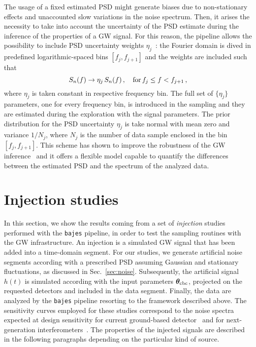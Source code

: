 \documentclass[prd,aps,twocolumn,a4paper,showkeys,nofootinbib,floatfix]{revtex4-1}
\newcommand{\be}{\begin{equation}}
\newcommand{\ee}{\end{equation}}
\def\params{\boldsymbol{\theta}}
\newcommand{\bajes}{{\tt bajes}}
\begin{document}
The usage of a fixed estimated PSD 
might generate biases due to non-stationary effects 
and unaccounted slow variations in the noise spectrum.
Then, it arises the necessity to take into account the 
uncertainty of the PSD estimate during the inference of the properties of a GW signal.
For this reason,
the pipeline allows the possibility to include PSD uncertainty weights $\eta_j$~\cite{Veitch:2014wba}:
the Fourier domain is dived in predefined logarithmic-spaced
bins $[f_j ,f_{j+1}]$ and the weights are included such that 
\be
\label{eq:psdweight}
S_n(f) \to \eta_j\,S_n(f)\,,\quad{\rm for }\, f_j \le f  <f_{j+1}\,,
\ee
where $\eta_j$ is taken constant in respective frequency bin.
The full set of $\{\eta_j\}$ parameters, one for every frequency bin,
is introduced in the sampling 
and they are estimated during the exploration with the signal parameters.
The prior distribution for the PSD uncertainty $\eta_j$ is take normal with mean zero and 
variance $1/N_j$, where $N_j$ is the number of data sample enclosed in the bin $[f_j,f_{j+1}]$.
This scheme has shown to improve the robustness of the 
GW inference~\cite{Littenberg:2013gja} and it 
offers a flexible model capable to quantify the differences between the 
estimated PSD and the spectrum of the analyzed data.

\section{Injection studies} 
\label{sec:inj}

In this section, we show the results coming from a set 
of {\it injection} studies 
performed with the {\bajes} pipeline,
in order to test the sampling routines with the GW infrastructure.
An injection is a simulated GW signal that has 
been added into a time-domain segment. 
For our studies, we generate artificial noise segments
according with a prescribed PSD assuming 
Gaussian and stationary fluctuations,
as discussed in Sec.~\ref{sec:noise}. 
Subsequently, 
the artificial signal $h(t)$ is simulated 
according with the input parameters $\params_{\rm cbc}$, 
projected on the requested detectors and included in the data segment.
Finally, the data are analyzed by the {\bajes} pipeline
resorting to the framework described above.
The sensitivity curves employed for these studies correspond to
the noise spectra expected at design sensitivity for current ground-based detector~\cite{TheLIGOScientific:2014jea,Aasi:2013wya,Harry:2010zz,TheVirgo:2014hva,Aso:2013eba,Akutsu:2018axf} 
and for next-generation interferometers~\cite{Punturo:2010zz,Hild:2010id}.
The properties of the injected signals are described in the following paragraphs 
depending on the particular kind of source.
\end{document}

